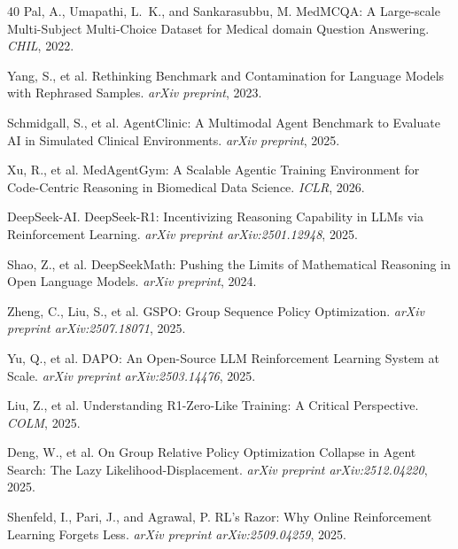 \documentclass{article}
\begin{document}
\begin{thebibliography}{40}
Pal, A., Umapathi, L.~K., and Sankarasubbu, M.
\newblock MedMCQA: A Large-scale Multi-Subject Multi-Choice Dataset for Medical domain Question Answering.
\newblock \emph{CHIL}, 2022.

Yang, S., et al.
\newblock Rethinking Benchmark and Contamination for Language Models with Rephrased Samples.
\newblock \emph{arXiv preprint}, 2023.


Schmidgall, S., et al.
\newblock AgentClinic: A Multimodal Agent Benchmark to Evaluate AI in Simulated Clinical Environments.
\newblock \emph{arXiv preprint}, 2025.

Xu, R., et al.
\newblock MedAgentGym: A Scalable Agentic Training Environment for Code-Centric Reasoning in Biomedical Data Science.
\newblock \emph{ICLR}, 2026.


DeepSeek-AI.
\newblock DeepSeek-R1: Incentivizing Reasoning Capability in LLMs via Reinforcement Learning.
\newblock \emph{arXiv preprint arXiv:2501.12948}, 2025.

Shao, Z., et al.
\newblock DeepSeekMath: Pushing the Limits of Mathematical Reasoning in Open Language Models.
\newblock \emph{arXiv preprint}, 2024.

Zheng, C., Liu, S., et al.
\newblock GSPO: Group Sequence Policy Optimization.
\newblock \emph{arXiv preprint arXiv:2507.18071}, 2025.

Yu, Q., et al.
\newblock DAPO: An Open-Source LLM Reinforcement Learning System at Scale.
\newblock \emph{arXiv preprint arXiv:2503.14476}, 2025.

Liu, Z., et al.
\newblock Understanding R1-Zero-Like Training: A Critical Perspective.
\newblock \emph{COLM}, 2025.

Deng, W., et al.
\newblock On Group Relative Policy Optimization Collapse in Agent Search: The Lazy Likelihood-Displacement.
\newblock \emph{arXiv preprint arXiv:2512.04220}, 2025.

Shenfeld, I., Pari, J., and Agrawal, P.
\newblock RL's Razor: Why Online Reinforcement Learning Forgets Less.
\newblock \emph{arXiv preprint arXiv:2509.04259}, 2025.


\end{thebibliography}
\end{document}
